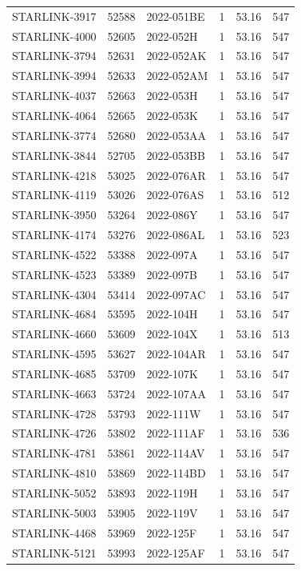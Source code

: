 \begin{longtable}{lllccc}
STARLINK-3917 & 52588 & 2022-051BE & 1 & 53.16 & 547 \\
STARLINK-4000 & 52605 & 2022-052H & 1 & 53.16 & 547 \\
STARLINK-3794 & 52631 & 2022-052AK & 1 & 53.16 & 547 \\
STARLINK-3994 & 52633 & 2022-052AM & 1 & 53.16 & 547 \\
STARLINK-4037 & 52663 & 2022-053H & 1 & 53.16 & 547 \\
STARLINK-4064 & 52665 & 2022-053K & 1 & 53.16 & 547 \\
STARLINK-3774 & 52680 & 2022-053AA & 1 & 53.16 & 547 \\
STARLINK-3844 & 52705 & 2022-053BB & 1 & 53.16 & 547 \\
STARLINK-4218 & 53025 & 2022-076AR & 1 & 53.16 & 547 \\
STARLINK-4119 & 53026 & 2022-076AS & 1 & 53.16 & 512 \\
STARLINK-3950 & 53264 & 2022-086Y & 1 & 53.16 & 547 \\
STARLINK-4174 & 53276 & 2022-086AL & 1 & 53.16 & 523 \\
STARLINK-4522 & 53388 & 2022-097A & 1 & 53.16 & 547 \\
STARLINK-4523 & 53389 & 2022-097B & 1 & 53.16 & 547 \\
STARLINK-4304 & 53414 & 2022-097AC & 1 & 53.16 & 547 \\
STARLINK-4684 & 53595 & 2022-104H & 1 & 53.16 & 547 \\
STARLINK-4660 & 53609 & 2022-104X & 1 & 53.16 & 513 \\
STARLINK-4595 & 53627 & 2022-104AR & 1 & 53.16 & 547 \\
STARLINK-4685 & 53709 & 2022-107K & 1 & 53.16 & 547 \\
STARLINK-4663 & 53724 & 2022-107AA & 1 & 53.16 & 547 \\
STARLINK-4728 & 53793 & 2022-111W & 1 & 53.16 & 547 \\
STARLINK-4726 & 53802 & 2022-111AF & 1 & 53.16 & 536 \\
STARLINK-4781 & 53861 & 2022-114AV & 1 & 53.16 & 547 \\
STARLINK-4810 & 53869 & 2022-114BD & 1 & 53.16 & 547 \\
STARLINK-5052 & 53893 & 2022-119H & 1 & 53.16 & 547 \\
STARLINK-5003 & 53905 & 2022-119V & 1 & 53.16 & 547 \\
STARLINK-4468 & 53969 & 2022-125F & 1 & 53.16 & 547 \\
STARLINK-5121 & 53993 & 2022-125AF & 1 & 53.16 & 547 \\

\end{longtable}
